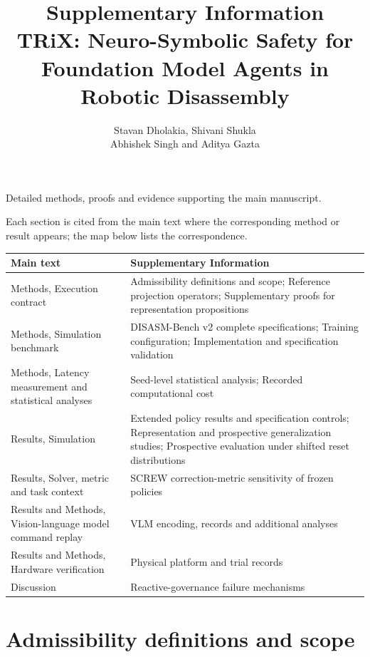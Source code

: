 \documentclass[10pt]{article}
\title{Supplementary Information\\\large TRiX: Neuro-Symbolic Safety for Foundation Model Agents in Robotic Disassembly}
\author{Stavan Dholakia, Shivani Shukla\\Abhishek Singh and Aditya Gazta}
\date{}
\begin{document}
\maketitle
\noindent Detailed methods, proofs and evidence supporting the main manuscript.

\begingroup
\renewcommand{\numberline}[1]{}
\setlength{\cftsecnumwidth}{0pt}
\setlength{\cftsubsecnumwidth}{0pt}
\tableofcontents
\endgroup
\bigskip
Each section is cited from the main text where the corresponding method or
result appears; the map below lists the correspondence.

\begin{center}
\small
\setlength{\tabcolsep}{6pt}
\begin{tabular}{@{}>{\raggedright\arraybackslash}p{2.9in}>{\raggedright\arraybackslash}p{3.1in}@{}}
\toprule
Main text & Supplementary Information\\
\midrule
Methods, Execution contract & Admissibility definitions and scope; Reference projection operators; Supplementary proofs for representation propositions\\
Methods, Simulation benchmark & DISASM-Bench v2 complete specifications; Training configuration; Implementation and specification validation\\
Methods, Latency measurement and statistical analyses & Seed-level statistical analysis; Recorded computational cost\\
Results, Simulation & Extended policy results and specification controls; Representation and prospective generalization studies; Prospective evaluation under shifted reset distributions\\
Results, Solver, metric and task context & SCREW correction-metric sensitivity of frozen policies\\
Results and Methods, Vision-language model command replay & VLM encoding, records and additional analyses\\
Results and Methods, Hardware verification & Physical platform and trial records\\
Discussion & Reactive-governance failure mechanisms\\
\bottomrule
\end{tabular}
\end{center}

\linenumbers
\section{Admissibility definitions and scope}
\end{document}
